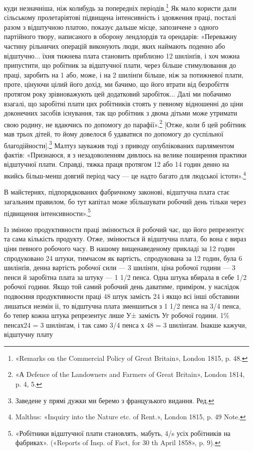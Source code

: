 \parcont{}  %
куди незначніша, ніж колибудь за попередніх періодів.\footnote{
«Remarks on the Commercial Policy of Great Britain», London
1815, p. 48.
} Як
мало користи дали сільському пролетаріятові підвищена інтенсивність
і здовження праці, посталі разом з відштучною платою,
показує дальше місце, запозичене з одного партійного твору,
написаного в оборону лендлордів та орендарів: «Переважну
частину рільничих операцій виконують люди, яких наймають
поденно або відштучно... їхня тижнева плата становить приблизно
12 шилінґів, і хоч можна припустити, що робітник за відштучної
плати, через більше стимулювання до праці, заробить на 1 або,
може, і на 2 шилінґи більше, ніж за потижневої плати, проте,
цінуючи цілий його дохід, ми бачимо, що його втрати від безробіття
протягом року зрівноважують цей додатковий заробіток...
Далі ми побачимо взагалі, що заробітні плати цих робітників
стоять у певному відношенні до ціни доконечних засобів існування,
так що робітник з двома дітьми може утримати свою родину,
не вдаючись по допомогу до парафії».\footnote{
«А Defence of the Landowners and Farmers of Great Britain», London
1814, p. 4, 5.
} [Отже, коли б цей
робітник мав трьох дітей, то йому довелося б удаватися по допомогу
до суспільної благодійности].\footnote*{
Заведене у прямі дужки ми беремо з французького видання. Ред.
} Малтуз зауважив тоді з
приводу опублікованих парляментом фактів: «Признаюся, я з
незадоволенням дивлюсь на велике поширення практики відштучної
плати. Справді, тяжка праця протягом 12 або 14 годин
денно на якийсь більш-менш довгий період часу — це надто багато
для людської істоти».\footnote{
Malthus: «Inquiry into the Nature etc. of Rent.», London 1815,
p. 49 Note.
}

В майстернях, підпорядкованих фабричному законові, відштучна
плата стає загальним правилом, бо тут капітал може збільшувати
робочий день тільки через підвищення інтенсивности».\footnote{
«Робітники відштучної плати становлять, мабуть, 4/s усіх робітників
на фабриках». («Reports of Insp. of Fact, for 30 th April
1858», p. 9).
}

Із зміною продуктивности праці змінюється й робочий час,
що його репрезентує та сама кількість продукту. Отже, змінюється
й відштучна плата, бо вона є вираз ціни певного робочого
часу. В нашому вищенаведеному прикладі за 12 годин спродуковано
24 штуки, тимчасом як вартість, спродукована за 12 годин,
була 6 шилінґів, денна вартість робочої сили — 3 шилінґи,
ціна робочої години — 3 пенси й заробітна плата за штуку —
1 1/2 пенса. Одна штука вбирала в себе 1/2 робочої години. Якщо
той самий робочий день даватиме, приміром, у наслідок подвоєння
продуктивности праці 48 штук замість 24 і якщо всі інші
обставини лишаться незмін іі, то відштучна плата зменшиться
з 1 1/2 пенса на 3/4 пенса, бо тепер кожна штука репрезентує лише
У± замість Уг робочої години. 1\% пенсах24 = 3 шилінґам, і так
само 3/4 пенса х 48 = 3 шилінґам. Інакше кажучи, відштучну плату
\parbreak{}  %
